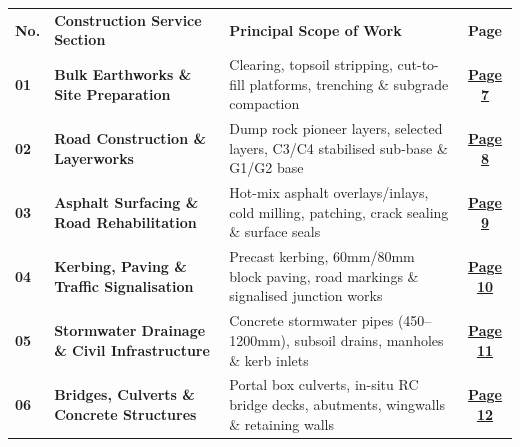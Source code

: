 \documentclass[a4paper,11pt]{article}
\begin{document}
\renewcommand{\arraystretch}{1.20}
\begin{tabularx}{\textwidth}{@{}l p{4.6cm} X c@{}}
\rowcolor{mhnavy}
{\color{white}\bfseries\fontsize{7.8pt}{9.2pt}\selectfont No.} &
{\color{white}\bfseries\fontsize{7.8pt}{9.2pt}\selectfont Construction Service Section} &
{\color{white}\bfseries\fontsize{7.8pt}{9.2pt}\selectfont Principal Scope of Work} &
{\color{white}\bfseries\fontsize{7.8pt}{9.2pt}\selectfont Page} \\
\rowcolor{mhbluelight}
\fontsize{7.5pt}{9.1pt}\selectfont\bfseries 01 & \fontsize{7.5pt}{9.1pt}\selectfont\bfseries Bulk Earthworks \& Site Preparation & \fontsize{7.5pt}{9.1pt}\selectfont Clearing, topsoil stripping, cut-to-fill platforms, trenching \& subgrade compaction & \fontsize{7.5pt}{9.1pt}\selectfont\hyperlink{sec:earthworks}{\bfseries\color{mhblue}Page 7} \\
\fontsize{7.5pt}{9.1pt}\selectfont\bfseries 02 & \fontsize{7.5pt}{9.1pt}\selectfont\bfseries Road Construction \& Layerworks & \fontsize{7.5pt}{9.1pt}\selectfont Dump rock pioneer layers, selected layers, C3/C4 stabilised sub-base \& G1/G2 base & \fontsize{7.5pt}{9.1pt}\selectfont\hyperlink{sec:roads}{\bfseries\color{mhblue}Page 8} \\
\rowcolor{mhbluelight}
\fontsize{7.5pt}{9.1pt}\selectfont\bfseries 03 & \fontsize{7.5pt}{9.1pt}\selectfont\bfseries Asphalt Surfacing \& Road Rehabilitation & \fontsize{7.5pt}{9.1pt}\selectfont Hot-mix asphalt overlays/inlays, cold milling, patching, crack sealing \& surface seals & \fontsize{7.5pt}{9.1pt}\selectfont\hyperlink{sec:asphalt}{\bfseries\color{mhblue}Page 9} \\
\fontsize{7.5pt}{9.1pt}\selectfont\bfseries 04 & \fontsize{7.5pt}{9.1pt}\selectfont\bfseries Kerbing, Paving \& Traffic Signalisation & \fontsize{7.5pt}{9.1pt}\selectfont Precast kerbing, 60mm/80mm block paving, road markings \& signalised junction works & \fontsize{7.5pt}{9.1pt}\selectfont\hyperlink{sec:kerbing}{\bfseries\color{mhblue}Page 10} \\
\rowcolor{mhbluelight}
\fontsize{7.5pt}{9.1pt}\selectfont\bfseries 05 & \fontsize{7.5pt}{9.1pt}\selectfont\bfseries Stormwater Drainage \& Civil Infrastructure & \fontsize{7.5pt}{9.1pt}\selectfont Concrete stormwater pipes (450--1200mm), subsoil drains, manholes \& kerb inlets & \fontsize{7.5pt}{9.1pt}\selectfont\hyperlink{sec:stormwater}{\bfseries\color{mhblue}Page 11} \\
\fontsize{7.5pt}{9.1pt}\selectfont\bfseries 06 & \fontsize{7.5pt}{9.1pt}\selectfont\bfseries Bridges, Culverts \& Concrete Structures & \fontsize{7.5pt}{9.1pt}\selectfont Portal box culverts, in-situ RC bridge decks, abutments, wingwalls \& retaining walls & \fontsize{7.5pt}{9.1pt}\selectfont\hyperlink{sec:bridges}{\bfseries\color{mhblue}Page 12} \\

\end{tabularx}
\end{document}
